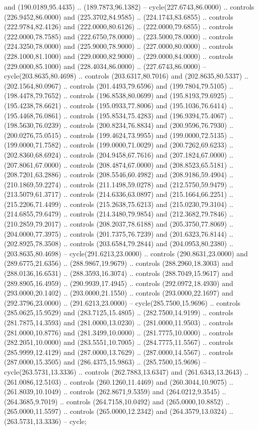   and (190.0189,95.4435) .. (189.7873,96.1382) -- cycle(227.6743,86.0000) ..
  controls (226.9452,86.0000) and (225.3702,84.9585) .. (224.1743,83.6855) ..
  controls (222.9784,82.4126) and (222.0000,80.6126) .. (222.0000,79.6855) ..
  controls (222.0000,78.7585) and (222.6750,78.0000) .. (223.5000,78.0000) ..
  controls (224.3250,78.0000) and (225.9000,78.9000) .. (227.0000,80.0000) ..
  controls (228.1000,81.1000) and (229.0000,82.9000) .. (229.0000,84.0000) ..
  controls (229.0000,85.1000) and (228.4034,86.0000) .. (227.6743,86.0000) --
  cycle(203.8635,80.4698) .. controls (203.6317,80.7016) and (202.8635,80.5337)
  .. (202.1564,80.0967) .. controls (201.4493,79.6596) and (199.7804,79.5105) ..
  (198.4478,79.7652) .. controls (196.8538,80.0699) and (195.8193,79.6925) ..
  (195.4238,78.6621) .. controls (195.0933,77.8006) and (195.1036,76.6414) ..
  (195.4468,76.0861) .. controls (195.8534,75.4283) and (196.9394,75.4067) ..
  (198.5630,76.0239) .. controls (200.8234,76.8834) and (200.9596,76.7930) ..
  (200.0276,75.0515) .. controls (199.4624,73.9955) and (199.0000,72.5135) ..
  (199.0000,71.7582) .. controls (199.0000,71.0029) and (200.7262,69.6233) ..
  (202.8360,68.6924) .. controls (204.9458,67.7616) and (207.1824,67.0000) ..
  (207.8061,67.0000) .. controls (208.4874,67.0000) and (208.8523,65.5181) ..
  (208.7201,63.2886) .. controls (208.5546,60.4982) and (208.9186,59.4904) ..
  (210.1869,59.2274) .. controls (211.1498,59.0278) and (212.5750,59.9479) ..
  (213.5079,61.3717) .. controls (214.6336,63.0897) and (215.1664,66.2251) ..
  (215.2206,71.4499) .. controls (215.2638,75.6213) and (215.0230,79.3104) ..
  (214.6855,79.6479) .. controls (214.3480,79.9854) and (212.3682,79.7846) ..
  (210.2859,79.2017) .. controls (208.2037,78.6188) and (205.3750,77.8069) ..
  (204.0000,77.3975) .. controls (201.7375,76.7239) and (201.6323,76.8144) ..
  (202.8925,78.3508) .. controls (203.6584,79.2844) and (204.0953,80.2380) ..
  (203.8635,80.4698) -- cycle(291.6213,23.0000) .. controls (290.8631,23.0000)
  and (289.6775,21.6356) .. (288.9867,19.9679) .. controls (288.2960,18.3003)
  and (288.0136,16.6531) .. (288.3593,16.3074) .. controls (288.7049,15.9617)
  and (289.8905,16.4959) .. (290.9939,17.4945) .. controls (292.0972,18.4930)
  and (293.0000,20.1402) .. (293.0000,21.1550) .. controls (293.0000,22.1697)
  and (292.3796,23.0000) .. (291.6213,23.0000) -- cycle(285.7500,15.9696) ..
  controls (285.0625,15.9529) and (283.7125,15.4805) .. (282.7500,14.9199) ..
  controls (281.7875,14.3593) and (281.0000,13.0230) .. (281.0000,11.9503) ..
  controls (281.0000,10.8776) and (281.3499,10.0000) .. (281.7775,10.0000) ..
  controls (282.2051,10.0000) and (283.5551,10.7005) .. (284.7775,11.5567) ..
  controls (285.9999,12.4129) and (287.0000,13.7629) .. (287.0000,14.5567) ..
  controls (287.0000,15.3505) and (286.4375,15.9863) .. (285.7500,15.9696) --
  cycle(263.5731,13.3336) .. controls (262.7883,13.6347) and (261.6343,13.2643)
  .. (261.0086,12.5103) .. controls (260.1260,11.4469) and (260.3044,10.9075) ..
  (261.8039,10.1049) .. controls (262.8671,9.5359) and (264.0212,9.3545) ..
  (264.3685,9.7019) .. controls (264.7158,10.0492) and (265.0000,10.8852) ..
  (265.0000,11.5597) .. controls (265.0000,12.2342) and (264.3579,13.0324) ..
  (263.5731,13.3336) -- cycle;

